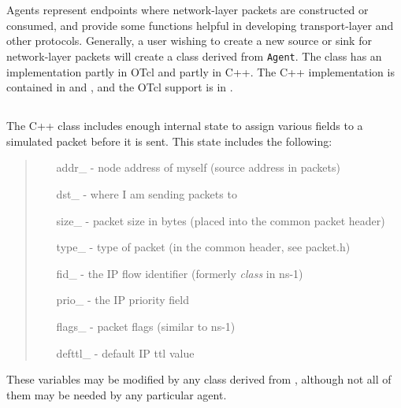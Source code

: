 %
%
\chapter{}

Agents represent endpoints where network-layer
packets are constructed or consumed, and provide
some functions helpful in developing transport-layer and other
protocols.
Generally, a user wishing to create a new
source or sink for network-layer packets
will create a class derived from {\tt Agent}.
The class  has an implementation partly in
OTcl and partly in C++.
The C++ implementation is contained in  and
, and the OTcl support is in
.

\section{}

The C++ class  includes enough internal state
to assign various fields to a simulated packet before
it is sent.
This state includes the following:
\begin{quote}
\begin{itemize}
        \item[addr\_] - node address of myself (source address in packets)
        \item[dst\_] - where I am sending packets to
        \item[size\_] - packet size in bytes (placed into the common packet header)
        \item[type\_] - type of packet (in the common header, see packet.h)
        \item[fid\_] - the IP flow identifier (formerly {\em class} in ns-1)
        \item[prio\_] - the IP priority field
	\item[flags\_] - packet flags (similar to ns-1)
	\item[defttl\_] - default IP ttl value
\end{itemize}
\end{quote}
These variables may be modified by any class derived from ,
although not all of them may be needed by any particular agent.

